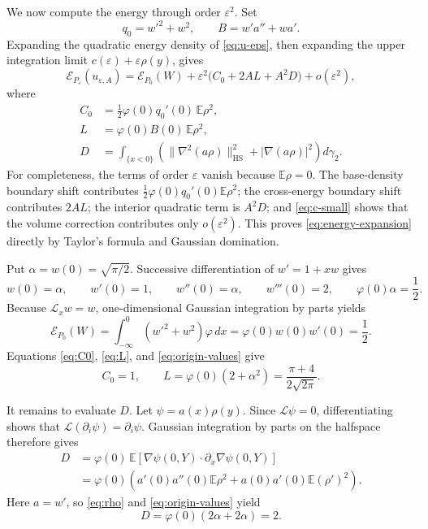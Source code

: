 \documentclass[11pt]{article}
\newcommand{\eps}{\varepsilon}
\newcommand{\cL}{\mathcal L}
\begin{document}
We now compute the energy through order $\eps^2$.  Set
\[
 q_0=w'^2+w^2,
 \qquad
 B=w'a''+wa'.
\]
Expanding the quadratic energy density of \eqref{eq:u-eps}, then expanding
the upper integration limit $c(\eps)+\eps\rho(y)$, gives
\begin{equation}\label{eq:energy-expansion}
 \mathcal E_{P_\eps}(u_{\eps,A})
 =\mathcal E_{P_0}(W)
  +\eps^2\bigl(C_0+2AL+A^2D\bigr)+o(\eps^2),
\end{equation}
where
\begin{align}
 C_0&=\frac12\varphi(0)q_0'(0)\,\mathbb E\rho^2,\label{eq:C0}\\
 L&=\varphi(0)B(0)\,\mathbb E\rho^2,\label{eq:L}\\
 D&=\int_{\{x<0\}}
 \left(\|\nabla^2(a\rho)\|_{\mathrm{HS}}^2
             +|\nabla(a\rho)|^2\right)d\gamma_2.\label{eq:D}
\end{align}
For completeness, the terms of order $\eps$ vanish because
$\mathbb E\rho=0$.  The base-density boundary shift contributes
$\frac12\varphi(0)q_0'(0)\mathbb E\rho^2$; the cross-energy boundary shift
contributes $2AL$; the interior quadratic term is $A^2D$; and
\eqref{eq:c-small} shows that the volume correction contributes only
$o(\eps^2)$.  This proves \eqref{eq:energy-expansion} directly by Taylor's
formula and Gaussian domination.

Put $\alpha=w(0)=\sqrt{\pi/2}$.  Successive differentiation of
$w'=1+xw$ gives
\begin{equation}\label{eq:origin-values}
 w(0)=\alpha,
 \qquad w'(0)=1,
 \qquad w''(0)=\alpha,
 \qquad w'''(0)=2,
 \qquad \varphi(0)\alpha=\frac12.
\end{equation}
Because $\cL_xw=w$, one-dimensional Gaussian integration by parts yields
\begin{equation}\label{eq:E0}
 \mathcal E_{P_0}(W)
 =\int_{-\infty}^0(w'^2+w^2)\varphi\,dx
 =\varphi(0)w(0)w'(0)=\frac12.
\end{equation}
Equations \eqref{eq:C0}, \eqref{eq:L}, and \eqref{eq:origin-values} give
\begin{equation}\label{eq:C0L-values}
 C_0=1,
 \qquad
 L=\varphi(0)(2+\alpha^2)
   =\frac{\pi+4}{2\sqrt{2\pi}}.
\end{equation}

It remains to evaluate $D$.  Let $\psi=a(x)\rho(y)$.  Since $\cL\psi=0$,
differentiating shows that $\cL(\partial_i\psi)=\partial_i\psi$.  Gaussian
integration by parts on the halfspace therefore gives
\begin{align*}
 D
 &=\varphi(0)\,\mathbb E\left[
       \nabla\psi(0,Y)\mathbin{\cdot}\partial_x\nabla\psi(0,Y)
     \right]\\
 &=\varphi(0)\left(
       a'(0)a''(0)\mathbb E\rho^2
       +a(0)a'(0)\mathbb E(\rho')^2
     \right).
\end{align*}
Here $a=w'$, so \eqref{eq:rho} and \eqref{eq:origin-values} yield
\begin{equation}\label{eq:D-value}
 D=\varphi(0)(2\alpha+2\alpha)=2.
\end{equation}
\end{document}
